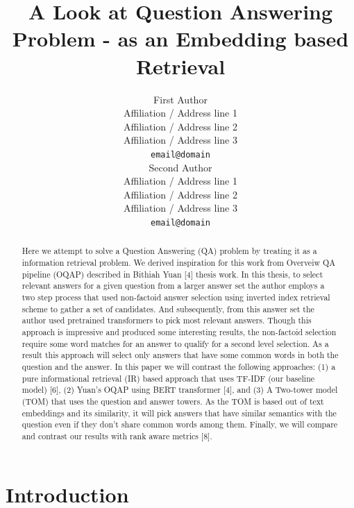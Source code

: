 \documentclass[11pt,a4paper]{article}
\title{A Look at Question Answering Problem - as an Embedding based Retrieval}
\author{First Author \\
  Affiliation / Address line 1 \\
  Affiliation / Address line 2 \\
  Affiliation / Address line 3 \\
  \texttt{email@domain} \\\And
  Second Author \\
  Affiliation / Address line 1 \\
  Affiliation / Address line 2 \\
  Affiliation / Address line 3 \\
  \texttt{email@domain} \\}
\date{}
\begin{document}
\maketitle
\begin{abstract}
Here we attempt to solve a Question Answering (QA) problem by treating it as a information retrieval problem. We derived inspiration for this work from Overveiw QA pipeline (OQAP) described in Bithiah Yuan [4] thesis work. In this thesis, to select relevant answers for a given question from a larger answer set the author employs a two step process that used non-factoid answer selection using inverted index retrieval scheme to gather a set of candidates. And subsequently, from this answer set the author used pretrained transformers to pick most relevant answers. Though this approach is impressive and produced some interesting results, the non-factoid selection require some word matches for an answer to qualify for a second level selection. As a result this approach will select only answers that have some common words in both the question and the answer. In this paper we will contrast the following approaches: (1) a pure informational retrieval (IR) based approach that uses TF-IDF (our baseline model) [6], (2) Yuan's OQAP using BERT transformer [4], and (3) A Two-tower model (TOM) that uses the question and answer towers. As the TOM is based out of text embeddings and its similarity, it will pick answers that have similar semantics with the question even if they don't share common words among them. Finally, we will compare and contrast our results with rank aware metrics [8].


\end{abstract}

\section{Introduction}
\end{document}
